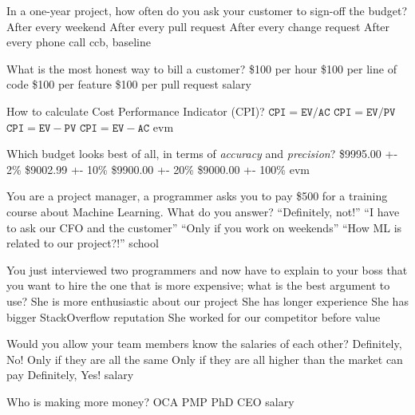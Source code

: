 \documentclass{article}
\begin{document}

\pmbaQuestion
  {In a one-year project, how often do you ask your customer to sign-off the budget?}
  {After every weekend}
  {After every pull request}
  {After every change request}
  {After every phone call}
  {ccb, baseline}

\pmbaQuestion
  {What is the most honest way to bill a customer?}
  {\$100 per hour}
  {\$100 per line of code}
  {\$100 per feature}
  {\$100 per pull request}
  {salary}

\pmbaQuestion
  {How to calculate Cost Performance Indicator (CPI)?}
  {\(\texttt{CPI} = \texttt{EV} / \texttt{AC}\)} %
  {\(\texttt{CPI} = \texttt{EV} / \texttt{PV}\)} %
  {\(\texttt{CPI} = \texttt{EV} - \texttt{PV}\)} %
  {\(\texttt{CPI} = \texttt{EV} - \texttt{AC}\)} %
  {evm}

\pmbaQuestion
  {Which budget looks best of all, in terms of \emph{accuracy} and \emph{precision}?}
  {\$9995.00 +- 2\%}
  {\$9002.99 +- 10\%}
  {\$9900.00 +- 20\%}
  {\$9000.00 +- 100\%}
  {evm}

\pmbaQuestion
  {You are a project manager, a programmer asks you to pay \$500 for a training course about Machine Learning. What do you answer?}
  {``Definitely, not!''}
  {``I have to ask our CFO and the customer''}
  {``Only if you work on weekends''}
  {``How ML is related to our project?!''}
  {school}

\pmbaQuestion
  {You just interviewed two programmers and now have to explain to your boss that you want to hire the one that is more expensive; what is the best argument to use?}
  {She is more enthusiastic about our project}
  {She has longer experience}
  {She has bigger StackOverflow reputation}
  {She worked for our competitor before}
  {value}

\pmbaQuestion
  {Would you allow your team members know the salaries of each other?}
  {Definitely, No!}
  {Only if they are all the same}
  {Only if they are all higher than the market can pay}
  {Definitely, Yes!}
  {salary}

\pmbaQuestion
  {Who is making more money?}
  {OCA}
  {PMP}
  {PhD}
  {CEO}
  {salary}


\end{document}
